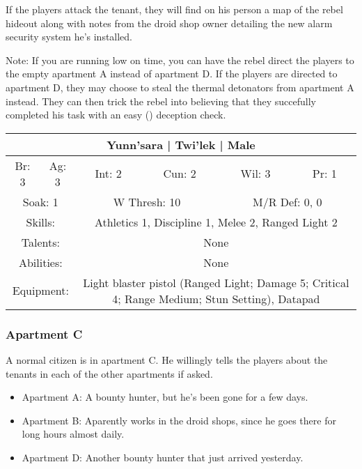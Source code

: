 \documentclass[letterpaper]{article}
\begin{document}
If the players attack the tenant, they will find on his person a map of the rebel hideout along with notes from the droid shop owner detailing the new alarm security system he's installed.

Note: If you are running low on time, you can have the rebel direct the players to the empty apartment A instead of apartment D. If the players are directed to apartment D, they may choose to steal the thermal detonators from apartment A instead. They can then trick the rebel into believing that they succefully completed his task with an easy (\difficulty) deception check.

\begin{center}
\begin{tabular}{| c c c c c c |}
    \hline
    \multicolumn{6}{|c|}{Yunn'sara | Twi'lek | Male} \\
    \hline
    Br: 3 & Ag: 3 & Int: 2 & Cun: 2 & Wil: 3 & Pr: 1 \\[2mm]
    \multicolumn{2}{|c}{Soak: 1} & \multicolumn{2}{c}{W Thresh: 10} & \multicolumn{2}{c|}{M/R Def: 0, 0} \\
    \hline
    \multicolumn{2}{|c}{Skills:} & \multicolumn{4}{p{5cm}|}{Athletics 1, Discipline 1, Melee 2, Ranged Light 2} \\
    \multicolumn{2}{|c}{Talents:} & \multicolumn{4}{p{5cm}|}{None} \\
    \multicolumn{2}{|c}{Abilities:} & \multicolumn{4}{p{5cm}|}{None} \\
    \multicolumn{2}{|c}{Equipment:} & \multicolumn{4}{p{5cm}|}{Light blaster pistol (Ranged Light; Damage 5; Critical 4; Range Medium; Stun Setting), Datapad} \\
    \hline
\end{tabular}
\end{center}

\subsubsection{Apartment C}

A normal citizen is in apartment C. He willingly tells the players about the tenants in each of the other apartments if asked.

\begin{itemize}
    \item Apartment A: A bounty hunter, but he's been gone for a few days.
    \item Apartment B: Aparently works in the droid shops, since he goes there for long hours almost daily. 
    \item Apartment D: Another bounty hunter that just arrived yesterday.
\end{itemize}
\end{document}
